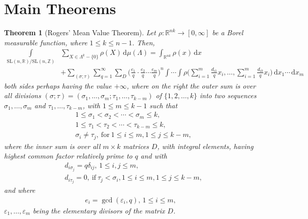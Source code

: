 \documentclass[11pt]{article}
\newtheorem{theorem}{Theorem}[section]
\theoremstyle{definition}
\theoremstyle{proof}
\begin{document}
\section{Main Theorems}
\begin{theorem}[Rogers' Mean Value Theorem]\label{rmvt}
    Let $\rho : \mathbb{R}^{nk} \to [0, \infty]$ be a Borel measurable function, where $1 \leq k \leq n-1$.
    Then,
    \begin{equation}\label{rmvteq}
        \begin{split}
            \int\limits_{\mathrm{SL}(n,\mathbb{R})/\mathrm{SL}(n,\mathbb{Z})} & \sum_{X \in \Lambda ^k - \{0\}} \rho (X) \, \mathrm{d} \mu (\Lambda ) = \int_{\mathbb{R}^{nk}} \rho (x) \,  \mathrm{d} x \\
            & + \sum_{(\sigma ; \tau )} \sum_{q=1}^{\infty}\sum_{D} {\bigg(\frac{e_1}{q} \cdot \frac{e_2}{q} \cdots \frac{e_m}{q} \bigg)}^n \int \cdots \int \rho \bigg(\sum_{i=1}^{m}\frac{d_{i1}}{q} x_i, \ldots , \sum_{i=1}^{m}\frac{d_{ik}}{q} x_i \bigg) \, \mathrm{d} x_1 \cdots \, \mathrm{d} x_m
        \end{split}
    \end{equation}
    both sides perhaps having the value $+\infty$, where on the right the outer sum is over all divisions $(\sigma ; \tau ) = (\sigma _1, \ldots, \sigma _m; \tau _1, \ldots, \tau _{k-m})$ of $\{1, 2, \ldots , k\}$ into two sequences $\sigma _1, \ldots , \sigma _m$ and $\tau _1, \ldots , \tau _{k-m}$, with $1\leq m \leq k-1$ such that
    \begin{equation}\label{sigmatau}
        \begin{split}
            & 1 \leq \sigma _1 < \sigma _2 < \cdots < \sigma _m \leq  k, \\
            & 1 \leq  \tau _1 < \tau _2 < \cdots < \tau _{k-m} \leq  k, \\
            & \sigma _i \neq \tau _j, \ \text{for} \  1\leq  i \leq  m, 1\leq  j\leq  k-m,
        \end{split}
    \end{equation}
    where the inner sum is over all $m \times k$ matrices $D$, with integral elements, having highest common factor relatively prime to $q$ and with
    \begin{equation}\label{D}
        \begin{split}
            & d_{i \sigma _j} = q \delta _{ij}, \,  1 \leq  i, j \leq  m,\\
            & d_{i \tau _j} = 0, \ \text{if} \ \tau _j < \sigma _i, 1 \leq  i \leq m , 1\leq  j \leq  k-m,
        \end{split}
    \end{equation}
    and where
    \begin{align*}
        e_i = \gcd (\varepsilon _i, q), \, 1 \leq  i \leq  m,
    \end{align*}
    $\varepsilon _1, \ldots , \varepsilon _m$ being the elementary divisors of the matrix $D$.


\end{theorem}
\end{document}
